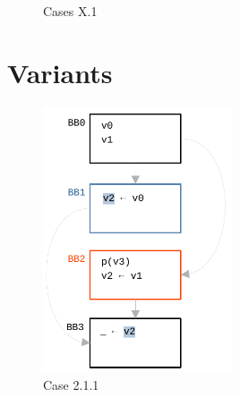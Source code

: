 \documentclass[12pt]{article}
\begin{document}
\begin{figure}[h!]
  \centering
   \hfill
  \caption{Cases X.1}
\end{figure}

\section{Variants}

\begin{figure}[h!]
  \centering
  \includegraphics[width=0.5\textwidth]{examples/case_2_1_1}
  \caption{Case 2.1.1}
\end{figure}
\end{document}
